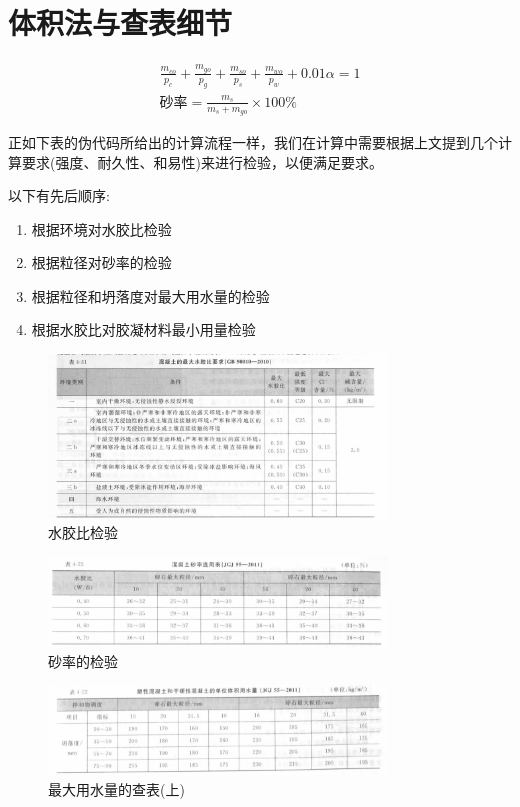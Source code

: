 \documentclass[12pt, a4paper, oneside, UTF8]{ctexbook}
\begin{document}
\section{体积法与查表细节}
\[
\begin{array}{c}
\frac{m_{co}}{p_c} + \frac{m_{go}}{p_g} + \frac{m_{so}}{p_s} + \frac{m_{wo}}{p_w} + 0.01\alpha = 1 \\
\text{砂率} = \frac{m_{s}}{m_{s} + m_{go}} \times 100\% 
\end{array}
\]

正如下表的伪代码所给出的计算流程一样，我们在计算中需要根据上文提到几个计算要求(强度、耐久性、和易性)来进行检验，以便满足要求。

以下有先后顺序:
\begin{enumerate}
	\item 根据环境对水胶比检验
	\item 根据粒径对砂率的检验
	\item 根据粒径和坍落度对最大用水量的检验
	\item 根据水胶比对胶凝材料最小用量检验
\end{enumerate}

\begin{figure}[H]
	\centering
	\includegraphics[width=0.8\textwidth]{../figure/1.png}
	\caption{水胶比检验}
	\label{fig:water_cement_ratio}
\end{figure}

\begin{figure}[H]
	\centering
	\includegraphics[width=0.8\textwidth]{../figure/8.png}
	\caption{砂率的检验}
	\label{fig:sand_rate_check}
\end{figure}

\begin{figure}[H]
	\centering
	\includegraphics[width=0.8\textwidth]{../figure/6.png}
	\caption{最大用水量的查表(上)}
	\label{fig:min_water_check}
\end{figure}
\end{document}

